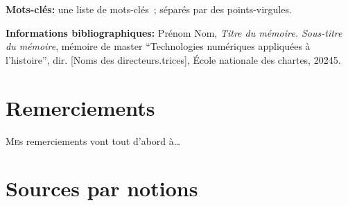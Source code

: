 \documentclass[12pt,twoside]{book}
\begin{document}
	\textbf{Mots-clés:} une liste de mots-clés~; séparés par des points-virgules.
	
	\textbf{Informations bibliographiques:} Prénom Nom, \textit{Titre du mémoire. Sous-titre du mémoire}, mémoire de master \enquote{Technologies numériques appliquées à l'histoire}, dir. [Noms des directeurs.trices], École nationale des chartes, 20245.
	
	
	
		\newpage{\pagestyle{empty}\cleardoublepage}
	
%	
%	
%	
%	
%	
%	
%	
%	
%	
%	
%	
%	
%	
%	
%	
%	
%	
%	
%	
%	
%	
%	
%	
%	
%	
%	
%	
	
	
	\chapter{Remerciements}
	
\lettrine{M}es remerciements vont tout d'abord à\dots
	\newpage{\pagestyle{empty}\cleardoublepage}
	
\nocite{*} %
\printbibliography

\chapter*{Sources par notions} %
\end{document}
